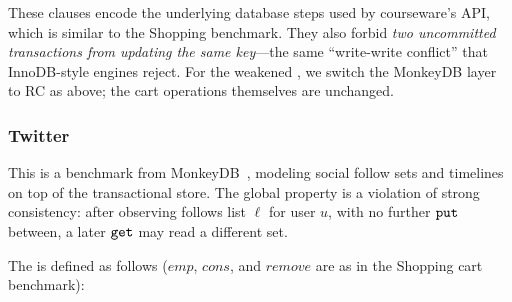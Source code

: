 \vspace{-.4cm}\par\nobreak\noindent
These clauses encode the underlying database steps used by courseware's API, which is similar to the \textsf{Shopping} benchmark. They also forbid \emph{two uncommitted transactions from updating the same key}---the same ``write-write conflict'' that InnoDB-style engines reject. For the weakened \tyName{}, we switch the MonkeyDB layer to RC as above; the cart operations themselves are unchanged.

\newpage
\subsubsection*{Twitter} This is a benchmark from MonkeyDB~\cite{MonkeyDB}, modeling social follow sets and timelines on top of the transactional store. The global property is a violation of strong consistency: after observing follows list $\ell$ for user \(u\), with no further \(\boldsymbol{{\tt put}}\) between, a later \(\boldsymbol{{\tt get}}\) may read a different set.
\vspace{-.35cm}\par{}
\vspace{-.4cm}\par\nobreak\noindent
The \tyName{} is defined as follows (\(\mathit{emp}\), \(\mathit{cons}\), and \(\mathit{remove}\) are as in the Shopping cart benchmark):
